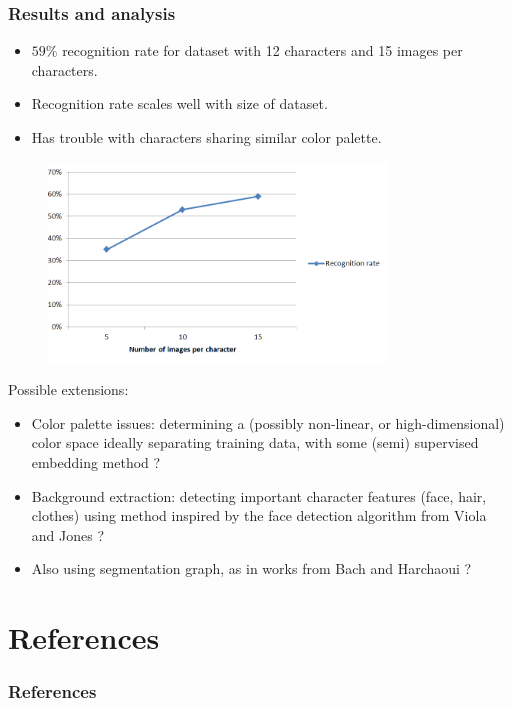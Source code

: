 \documentclass{beamer}
\begin{document}
\begin{frame}
\frametitle{Results and analysis}
\begin{itemize}
\item $59\%$ recognition rate for dataset with 12 characters and 15 images per characters.
\item Recognition rate scales well with size of dataset.
\item Has trouble with characters sharing similar color palette.
\end{itemize}

\begin{figure}[htb!]
\includegraphics[width=0.8\textwidth]{../images/recognitionRate.png}
\end{figure}

\end{frame}

\begin{frame}
Possible extensions:

\begin{itemize}
\item Color palette issues: determining a (possibly non-linear, or high-dimensional) color space ideally separating training data, with some (semi) supervised embedding method  \cite{urahama2007semi} ?
\item Background extraction: detecting important character features (face, hair, clothes) using method inspired by the face detection algorithm from Viola and Jones \cite{viola2004robust} ?
\item Also using segmentation graph, as in works from Bach and Harchaoui \cite{harchaoui2007image} ?
\end{itemize}
\end{frame}

\section{References}
\begin{frame}
\frametitle{References}
\begin{small}
\printbibliography
\end{small}
\end{frame}
\end{document}
